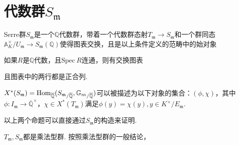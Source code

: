 \section{代数群\texorpdfstring{$S_{\mathfrak{m}}$}{Sm}}

\begin{cdef}
    Serre群$S_{\mathfrak{m}}$是一个$\mathbb{Q}$代数群，带着一个代数群态射$T_{\mathfrak{m}}\to S_{\mathfrak{m}}$和一个群同态$\mathbb{A}_K^{\times}/U_{\mathfrak{m}}\to S_{\mathfrak{m}}(\mathbb{Q})$使得图表交换，且是以上条件定义的范畴中的始对象
    \begin{figure}[H]
        \centering
    \end{figure}
\end{cdef}

\begin{cprop}
    如果$R$是$\mathbb{Q}$代数，且$\mathrm{Spec}\ R$连通，则有交换图表
    \begin{figure}[H]
        \centering
    \end{figure}
    且图表中的两行都是正合列.
\end{cprop}

\begin{cprop}
    $X^{*}(S_{\mathfrak{m}}) = \mathrm{Hom}_{\overline{\mathbb{Q}}}({S_{\mathfrak{m}}}_{/\overline{\mathbb{Q}}}, {\mathbb{G}_{m}}_{/\overline{\mathbb{Q}}})$可以被描述为以下对象的集合：$(\phi, \chi)$，其中$\phi: I_{\mathfrak{m}}\to \overline{\mathbb{Q}}^{\times}$，$\chi\in X^{*}(T_{\mathfrak{m}})$满足$\phi(y) = \chi(y), y\in K^{\times}/ E_{\mathfrak{m}}$.
\end{cprop}

以上两个命题可以直接通过$S_{\mathfrak{m}}$的构造来证明.

$T_{\mathfrak{m}},S_{\mathfrak{m}}$都是乘法型群. 按照乘法型群的一般结论，

